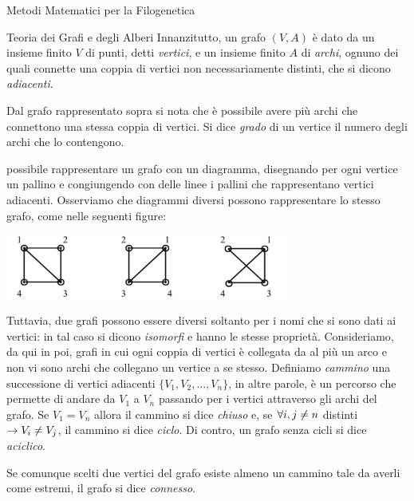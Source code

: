 \documentclass{article}
\begin{document}
\begin{section}{Metodi Matematici per la Filogenetica}
\begin{subsection}{Teoria dei Grafi e degli Alberi}
			Innanzitutto, un grafo $(V,A)$ è dato da un insieme finito $V$ di punti, detti \emph{vertici}, e un insieme finito $A$ di \emph{archi}, ognuno dei quali connette una coppia di vertici non necessariamente distinti, che si dicono \emph{adiacenti}.
			
			Dal grafo rappresentato sopra si nota che è possibile avere più archi che connettono una stessa coppia di vertici. Si dice \emph{grado} di un vertice il numero degli archi che lo contengono. 
			
			\Egrave possibile rappresentare un grafo con un diagramma, disegnando per ogni vertice un pallino e congiungendo con delle linee i pallini che rappresentano vertici adiacenti. Osserviamo che diagrammi diversi possono rappresentare lo stesso grafo, come nelle seguenti figure:
			\begin{center}
				\vspace{6pt}
				\includegraphics[width=0.7\textwidth]{Pics/diagramma1.png}
				\vspace{6pt}
			\end{center}
		
			Tuttavia, due grafi possono essere diversi soltanto per i nomi che si sono dati ai vertici: in tal caso si dicono \emph{isomorfi} e hanno le stesse proprietà. 
			Consideriamo, da qui in poi, grafi in cui ogni coppia di vertici è collegata da al più un arco e non vi sono archi che collegano un vertice a se stesso.
			Definiamo \emph{cammino} una successione di vertici adiacenti $\{V_1, V_2, \ldots, V_n\}$, in altre parole, è un percorso che permette di andare da $V_1$ a $V_n$ passando per i vertici  attraverso gli archi del grafo. Se $V_1 = V_n$ allora il cammino si dice \emph{chiuso} e, se $\forall i,j \neq n$ distinti $\rightarrow V_i \neq V_j$, il cammino si dice \emph{ciclo}. 
			Di contro, un grafo senza cicli si dice \emph{aciclico}. 
			
			Se comunque scelti due vertici del grafo esiste almeno un cammino tale da averli come estremi, il grafo si dice \emph{connesso}.
			

\end{subsection}
\end{section}
\end{document}
